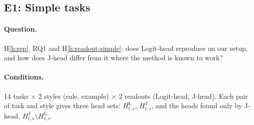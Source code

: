 \documentclass[11pt,a4paper]{article}
\begin{document}
\subsection{E1: Simple tasks}\label{sec:e1}
\paragraph{Question.} H\ref{h:rep}, RQ1 and H\ref{h:readout-simple}: does Logit-head reproduce \citet{yang2026shared} on our setup, and how does J-head differ from it where the method is known to work?

\paragraph{Conditions.} 14 tasks $\times$ 2 styles (rule, example) $\times$ 2 readouts (Logit-head, J-head). Each pair of task and style gives three head sets: $H^{\mathrm{L}}_{t,s}$, $H^{\mathrm{J}}_{t,s}$, and the heads found only by J-head, $H^{\mathrm{J}}_{t,s}\setminus H^{\mathrm{L}}_{t,s}$.
\end{document}
